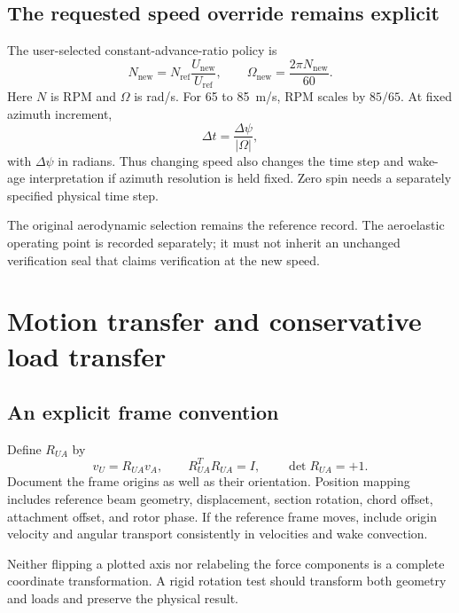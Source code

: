 \documentclass[11pt,a4paper]{article}
\begin{document}
\subsection{The requested speed override remains explicit}

The user-selected constant-advance-ratio policy is
\begin{equation}
 N_{\mathrm{new}}=N_{\mathrm{ref}}\frac{U_{\mathrm{new}}}{U_{\mathrm{ref}}},
 \qquad \Omega_{\mathrm{new}}=\frac{2\pi N_{\mathrm{new}}}{60}.
\end{equation}
Here $N$ is RPM and $\Omega$ is rad/s. For 65 to 85~m/s, RPM scales by
$85/65$. At fixed azimuth increment,
\begin{equation}
 \Delta t=\frac{\Delta\psi}{|\Omega|},
\end{equation}
with $\Delta\psi$ in radians. Thus changing speed also changes the time
step and wake-age interpretation if azimuth resolution is held fixed.
Zero spin needs a separately specified physical time step.

The original aerodynamic selection remains the reference record. The
aeroelastic operating point is recorded separately; it must not inherit an
unchanged verification seal that claims verification at the new speed.

\section{Motion transfer and conservative load transfer}
\label{sec:transfer}

\subsection{An explicit frame convention}

Define $R_{UA}$ by
\begin{equation}
 v_U=R_{UA}v_A,\qquad R_{UA}^{T}R_{UA}=I,\qquad\det R_{UA}=+1.
\end{equation}
Document the frame origins as well as their orientation. Position mapping
includes reference beam geometry, displacement, section rotation, chord
offset, attachment offset, and rotor phase. If the reference frame moves,
include origin velocity and angular transport consistently in velocities
and wake convection.

Neither flipping a plotted axis nor relabeling the force components is a
complete coordinate transformation. A rigid rotation test should transform
both geometry and loads and preserve the physical result.
\end{document}
